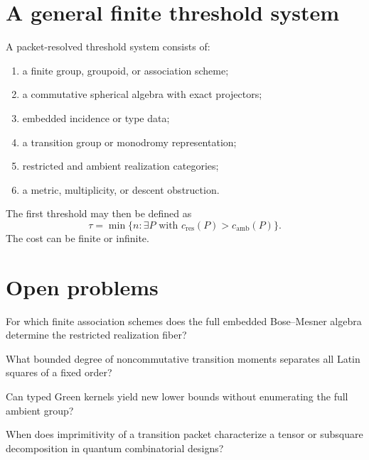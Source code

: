 \section{A general finite threshold system}
A packet-resolved threshold system consists of:
\begin{enumerate}
\item a finite group, groupoid, or association scheme;
\item a commutative spherical algebra with exact projectors;
\item embedded incidence or type data;
\item a transition group or monodromy representation;
\item restricted and ambient realization categories;
\item a metric, multiplicity, or descent obstruction.
\end{enumerate}

The first threshold may then be defined as
\[
\tau=
\min\{n:\exists P\text{ with }c_{\mathrm{res}}(P)>c_{\mathrm{amb}}(P)\}.
\]
The cost can be finite or infinite.

\section{Open problems}
\begin{question}
For which finite association schemes does the full embedded Bose--Mesner algebra determine the restricted realization fiber?
\end{question}
\begin{question}
What bounded degree of noncommutative transition moments separates all Latin squares of a fixed order?
\end{question}
\begin{question}
Can typed Green kernels yield new lower bounds without enumerating the full ambient group?
\end{question}
\begin{question}
When does imprimitivity of a transition packet characterize a tensor or subsquare decomposition in quantum combinatorial designs?
\end{question}
